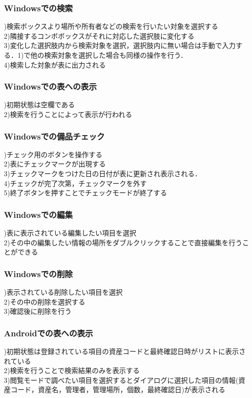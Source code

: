 \documentclass[11pt,a4j]{jarticle}
\begin{document}
\subsubsection{Windowsでの検索}
)検索ボックスより場所や所有者などの検索を行いたい対象を選択する
\\2)隣接するコンボボックスがそれに対応した選択肢に変化する
\\3)変化した選択肢内から検索対象を選択，選択肢内に無い場合は手動で入力する．1)で他の検索対象を選択した場合も同様の操作を行う．
\\4)検索した対象が表に出力される

\subsubsection{Windowsでの表への表示}
)初期状態は空欄である
\\2)検索を行うことによって表示が行われる

\subsubsection{Windowsでの備品チェック}
)チェック用のボタンを操作する
\\2)表にチェックマークが出現する
\\3)チェックマークをつけた日の日付が表に更新され表示される．
\\4)チェックが完了次第，チェックマークを外す
\\5)終了ボタンを押すことでチェックモードが終了する

\subsubsection{Windowsでの編集}
)表に表示されている編集したい項目を選択
\\2)その中の編集したい情報の場所をダブルクリックすることで直接編集を行うことができる

\subsubsection{Windowsでの削除}
)表示されている削除したい項目を選択
\\2)その中の削除を選択する
\\3)確認後に削除を行う

\subsubsection{Androidでの表への表示}
)初期状態は登録されている項目の資産コードと最終確認日時がリストに表示されている
\\2)検索を行うことで検索結果のみを表示する
\\3)閲覧モードで調べたい項目を選択するとダイアログに選択した項目の情報(資産コード，資産名，管理者，管理場所，個数，最終確認日)が表示される
\end{document}
